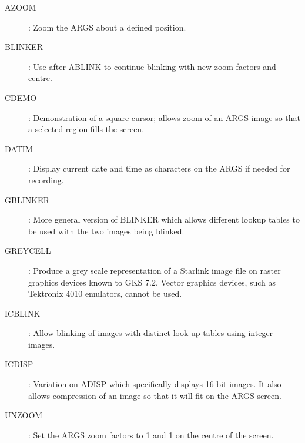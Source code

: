 \begin{description}
\begin{description}
\item [AZOOM]: Zoom the ARGS about a defined position.
\item [BLINKER]: Use after ABLINK to continue blinking with new zoom
factors and centre.
\item [CDEMO]: Demonstration of a square cursor; allows zoom of an ARGS image
so that a selected region fills the screen.
\item [DATIM]: Display current date and time as characters on the ARGS if
needed for recording.
\item [GBLINKER]: More general version of BLINKER which allows different
lookup tables to be used with the two images being blinked.
\item [GREYCELL]: Produce a grey scale representation of a Starlink image file
on raster graphics devices known to GKS 7.2.
Vector graphics devices, such as Tektronix 4010 emulators, cannot be used.
\item [ICBLINK]: Allow blinking of images with distinct look-up-tables using
integer images.
\item [ICDISP]: Variation on ADISP which specifically displays 16-bit images.
It also allows compression of an image so that it will fit on the ARGS screen.
\item [UNZOOM]: Set the ARGS zoom factors to 1 and 1 on the centre of the
screen.
\end{description}
\end{description}
